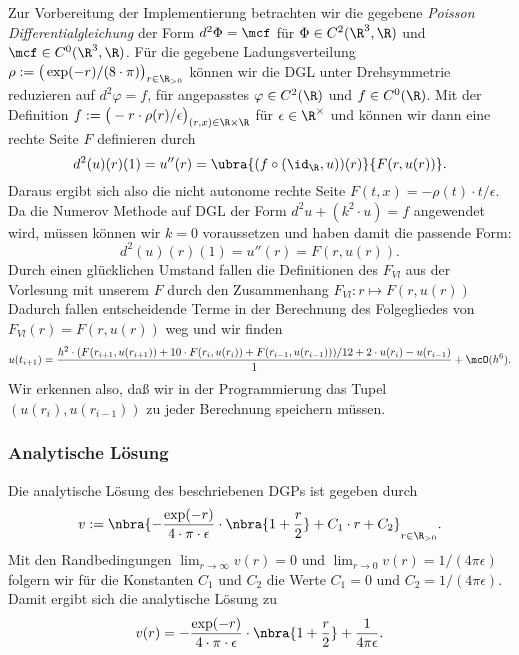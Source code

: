 \documentclass[
    oneside,
    ngerman,
    footinclude=false,
    captions=tableheading,
    DIV=12
]{scrartcl}
\begin{document}
    \aufgabe{}
        \subaufgabe{}
            Zur Vorbereitung der Implementierung betrachten wir die gegebene \emph{Poisson Differentialgleichung} der Form $d^2\Phi = \mcf$ für $\Phi\in C^2(\R^3,\R)$ und $\mcf\in C^0(\R^3,\R)$. Für die gegebene Ladungsverteilung $\rho:=\big(\exp(-r)/(8\cdot\pi)\big)_{r\in\R_{>0}}$ können wir die DGL unter Drehsymmetrie reduzieren auf $d^2\varphi = f$, für angepasstes $\varphi\in C^2(\R)$ und $f\in C^0(\R)$. Mit der Definition $f := \big(-r\cdot \rho(r) / \epsilon\big)_{(r,x)\in\R\times\R}$ für $\epsilon\in\R^\times$ und können wir dann eine rechte Seite $F$ definieren durch 
            \[
                d^2(u)(r)(1) = u''(r) = \ubra{(f\circ (\id_\R,u))(r)}{F(r,u(r))}.
            \] 
            Daraus ergibt sich also die nicht autonome rechte Seite $F(t,x) = -\rho(t)\cdot t / \epsilon$. Da die Numerov Methode auf DGL der Form $d^2 u + (k^2\cdot u) = f$ angewendet wird, müssen können wir $k = 0$ voraussetzen und haben damit die passende Form: 
            \[
                d^2(u)(r)(1) = u''(r) = F(r,u(r)).
            \]
            Durch einen glücklichen Umstand fallen die Definitionen des $F_\textit{Vl}$ aus der Vorlesung mit unserem $F$ durch den Zusammenhang $F_\textit{Vl}: r\mapsto F(r,u(r))$ Dadurch fallen entscheidende Terme in der Berechnung des Folgegliedes von $F_\textit{Vl}(r) = F(r,u(r))$ weg und wir finden 
            \[
                u(t_{i+1}) = \frac{h^2\cdot (F(r_{i+1},u(r_{i+1})) + 10\cdot F(r_i,u(r_i)) + F(r_{i-1},u(r_{i-1})))/12 + 2\cdot u(r_i) - u(r_{i-1})}{1} + \mcO(h^6).
            \]
            Wir erkennen also, daß wir in der Programmierung das Tupel $(u(r_{i}),u(r_{i-1}))$ zu jeder Berechnung speichern müssen. 

            \subsubsection*{Analytische Lösung}
                Die analytische Lösung des beschriebenen DGPs ist gegeben durch 
                \[
                    v := \nbra{-\frac{\exp(-r)}{4\cdot\pi\cdot\epsilon}\cdot\nbra{1 + \frac{r}{2}} + C_1\cdot r + C_2}_{r\in\R_{>0}}.
                \]
                Mit den Randbedingungen $\lim_{r\to\infty}v(r) = 0$ und $\lim_{r\to 0} v(r) = 1/(4\pi\epsilon)$ folgern wir für die Konstanten $C_1$ und $C_2$ die Werte $C_1 = 0$ und $C_2 = 1/(4\pi\epsilon)$. Damit ergibt sich die analytische Lösung zu
                \[
                    v(r) = -\frac{\exp(-r)}{4\cdot\pi\cdot\epsilon}\cdot\nbra{1 + \frac{r}{2}} + \frac{1}{4\pi\epsilon}.
                \]
        \subaufgabe{}
\end{document}
